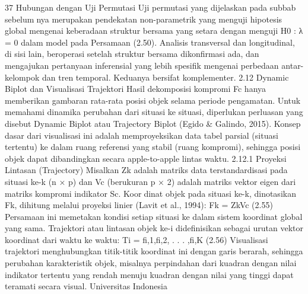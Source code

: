 37
Hubungan dengan Uji Permutasi Uji permutasi yang dijelaskan pada subbab sebelumnya merupakan pendekatan non-parametrik yang menguji hipotesis global mengenai
keberadaan struktur bersama yang setara dengan menguji H0 : λ = 0 dalam model
pada Persamaan (2.50). Analisis transversal dan longitudinal, di sisi lain, beroperasi
setelah struktur bersama dikonfirmasi ada, dan mengajukan pertanyaan inferensial yang
lebih spesifik mengenai perbedaan antar-kelompok dan tren temporal. Keduanya bersifat
komplementer.
2.12 Dynamic Biplot dan Visualisasi Trajektori
Hasil dekomposisi kompromi Fc hanya memberikan gambaran rata-rata posisi objek
selama periode pengamatan. Untuk memahami dinamika perubahan dari situasi ke situasi,
diperlukan perluasan yang disebut Dynamic Biplot atau Trajectory Biplot (Egido & Galindo,
2015).
Konsep dasar dari visualisasi ini adalah memproyeksikan data tabel parsial (situasi
tertentu) ke dalam ruang referensi yang stabil (ruang kompromi), sehingga posisi objek
dapat dibandingkan secara apple-to-apple lintas waktu.
2.12.1 Proyeksi Lintasan (Trajectory)
Misalkan Zk adalah matriks data terstandardisasi pada situasi ke-k (n × p) dan Vc
(berukuran p × 2) adalah matriks vektor eigen dari matriks kompromi indikator Sc. Koordinat objek pada situasi ke-k, dinotasikan Fk, dihitung melalui proyeksi linier (Lavit et al.,
1994):
Fk = ZkVc (2.55)
Persamaan ini memetakan kondisi setiap situasi ke dalam sistem koordinat global yang
sama. Trajektori atau lintasan objek ke-i didefinisikan sebagai urutan vektor koordinat
dari waktu ke waktu:
Ti = {fi,1,fi,2, . . . ,fi,K} (2.56)
Visualisasi trajektori menghubungkan titik-titik koordinat ini dengan garis berarah,
sehingga perubahan karakteristik objek, misalnya perpindahan dari kuadran dengan nilai
indikator tertentu yang rendah menuju kuadran dengan nilai yang tinggi dapat teramati
secara visual.
Universitas Indonesia

